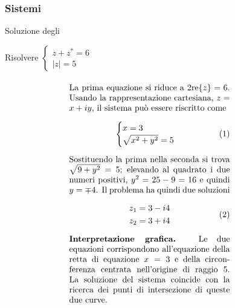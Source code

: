 \documentclass[letterpaper,10pt,italian]{jupyterBook}
\begin{document}
\subsubsection{Sistemi}
\label{\detokenize{ch/algebra/complex-algebra-sol:sistemi}}\label{\detokenize{ch/algebra/complex-algebra-sol:math-hs-algebra-complex-sol-equations-sys-sol}}
\sphinxAtStartPar
Soluzione degli {\hyperref[\detokenize{ch/algebra/complex-algebra-problems:math-hs-algebra-complex-problems-equations-sys}]{}}

\sphinxAtStartPar
{} Risolvere \(\begin{cases} z + z^* = 6 \\ |z| = 5 \end{cases}\)
\begin{equation*}
\begin{split}
\begin{minipage}[t]{.55\textwidth}
  \vspace{0pt}
La prima equazione si riduce a $2 \text{re}\{z\} = 6$. Usando la rappresentazione cartesiana, $z = x + i y$, il sistema può essere riscritto come
%
\begin{equation}\begin{cases}
  x = 3 \\
  \sqrt{x^2 +y^2} = 5
\end{cases}\end{equation}
%
Sostituendo la prima nella seconda si trova $\sqrt{9 + y^2} = 5$; elevando al quadrato i due numeri positivi, $y^2 = 25-9=16$ e quindi $y = \mp 4$. Il problema ha quindi due soluzioni
%
\begin{equation}\begin{aligned}
  z_1 & = 3 - i 4 \\
  z_2 & = 3 + i 4
\end{aligned}\end{equation}
%
\textbf{Interpretazione grafica.} Le due equazioni corrispondono all'equazione della retta di equazione $x = 3$ e della circonferenza centrata nell'origine di raggio $5$. La soluzione del sistema coincide con la ricerca dei punti di intersezione di queste due curve.
%
\end{minipage}
\hspace{.05\textwidth} %
\begin{minipage}[t]{.40\textwidth}
  \vspace{0pt}

\end{minipage}
\end{split}
\end{equation*}
\end{document}
